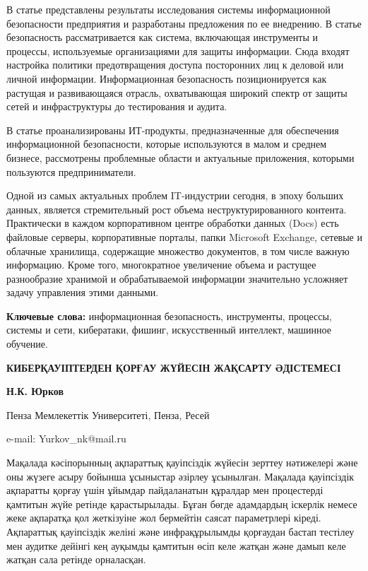 В статье представлены результаты исследования системы информационной
безопасности предприятия и разработаны предложения по ее внедрению. В
статье безопасность рассматривается как система, включающая инструменты
и процессы, используемые организациями для защиты информации. Сюда
входят настройка политики предотвращения доступа посторонних лиц к
деловой или личной информации. Информационная безопасность
позиционируется как растущая и развивающаяся отрасль, охватывающая
широкий спектр от защиты сетей и инфраструктуры до тестирования и
аудита.

В статье проанализированы ИТ-продукты, предназначенные для обеспечения
информационной безопасности, которые используются в малом и среднем
бизнесе, рассмотрены проблемные области и актуальные приложения,
которыми пользуются предприниматели.

Одной из самых актуальных проблем IT-индустрии сегодня, в эпоху больших
данных, является стремительный рост объема неструктурированного
контента. Практически в каждом корпоративном центре обработки данных
(Docs) есть файловые серверы, корпоративные порталы, папки Microsoft
Exchange, сетевые и облачные хранилища, содержащие множество документов,
в том числе важную информацию. Кроме того, многократное увеличение
объема и растущее разнообразие хранимой и обрабатываемой информации
значительно усложняет задачу управления этими данными.

{\bfseries Ключевые слова:} информационная безопасность, инструменты,
процессы, системы и сети, кибератаки, фишинг, искусственный интеллект,
машинное обучение.
\newpage
\begin{center}
{\large\bfseries КИБЕРҚАУІПТЕРДЕН ҚОРҒАУ ЖҮЙЕСІН ЖАҚСАРТУ ӘДІСТЕМЕСІ}

{\bfseries Н.К. Юрков}

Пенза Мемлекеттік Университеті, Пенза, Ресей

e-mail: Yurkov\_nk@mail.ru
\end{center}

Мақалада кәсіпорынның ақпараттық қауіпсіздік жүйесін зерттеу нәтижелері
және оны жүзеге асыру бойынша ұсыныстар әзірлеу ұсынылған. Мақалада
қауіпсіздік ақпаратты қорғау үшін ұйымдар пайдаланатын құралдар мен
процестерді қамтитын жүйе ретінде қарастырылады. Бұған бөгде адамдардың
іскерлік немесе жеке ақпаратқа қол жеткізуіне жол бермейтін саясат
параметрлері кіреді. Ақпараттық қауіпсіздік желіні және инфрақұрылымды
қорғаудан бастап тестілеу мен аудитке дейінгі кең ауқымды қамтитын өсіп
келе жатқан және дамып келе жатқан сала ретінде орналасқан.

